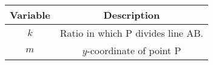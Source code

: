 \begin{tabular}[12pt]{ |c| c|}
    \hline
    \textbf{Variable} & \textbf{Description}\\ 
    \hline
    $k$ & Ratio in which P divides line AB. \\
    \hline 
    $m$ & $y$-coordinate of point P\\
    \hline
    \end{tabular}
